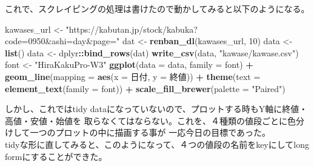 \documentclass[]{article}
\newenvironment{Shaded}{\begin{snugshade}}{\end{snugshade}}
\newcommand{\KeywordTok}[1]{\textcolor[rgb]{0.13,0.29,0.53}{\textbf{#1}}}
\newcommand{\DataTypeTok}[1]{\textcolor[rgb]{0.13,0.29,0.53}{#1}}
\newcommand{\DecValTok}[1]{\textcolor[rgb]{0.00,0.00,0.81}{#1}}
\newcommand{\StringTok}[1]{\textcolor[rgb]{0.31,0.60,0.02}{#1}}
\newcommand{\OperatorTok}[1]{\textcolor[rgb]{0.81,0.36,0.00}{\textbf{#1}}}
\newcommand{\NormalTok}[1]{#1}
\begin{document}
これで、スクレイピングの処理は書けたので動かしてみると以下のようになる。

\begin{Shaded}
\begin{Highlighting}[]
\NormalTok{kawases_url <-}\StringTok{ "https://kabutan.jp/stock/kabuka?code=0950&ashi=day&page="}
\NormalTok{dat <-}\StringTok{ }\KeywordTok{renban_dl}\NormalTok{(kawases_url, }\DecValTok{10}\NormalTok{)}
\NormalTok{data <-}\StringTok{ }\KeywordTok{list}\NormalTok{()}
\NormalTok{data <-}\StringTok{ }\NormalTok{dplyr}\OperatorTok{::}\KeywordTok{bind_rows}\NormalTok{(dat)}
\KeywordTok{write_csv}\NormalTok{(data, }\StringTok{"kawase/kawase.csv"}\NormalTok{)}
\NormalTok{font <-}\StringTok{ "HiraKakuPro-W3"}
\KeywordTok{ggplot}\NormalTok{(}\DataTypeTok{data =}\NormalTok{ data, }\DataTypeTok{family =}\NormalTok{ font) }\OperatorTok{+}
\StringTok{  }\KeywordTok{geom_line}\NormalTok{(}\DataTypeTok{mapping =} \KeywordTok{aes}\NormalTok{(}\DataTypeTok{x =}\NormalTok{ 日付, }\DataTypeTok{y =}\NormalTok{ 終値)) }\OperatorTok{+}
\StringTok{  }\KeywordTok{theme}\NormalTok{(}\DataTypeTok{text =} \KeywordTok{element_text}\NormalTok{(}\DataTypeTok{family =}\NormalTok{ font)) }\OperatorTok{+}
\StringTok{  }\KeywordTok{scale_fill_brewer}\NormalTok{(}\DataTypeTok{palette =} \StringTok{"Paired"}\NormalTok{)}
\end{Highlighting}
\end{Shaded}

しかし、これではtidy
dataになっていないので、プロットする時もY軸に終値・高値・安値・始値を
取らなくてはならない。これを、４種類の値段ごとに色分けして一つのプロットの中に描画する事が
一応今日の目標であった。\\
tidyな形に直してみると、このようになって、４つの値段の名前をkeyにしてlong
formにすることができた。

\begin{Shaded}
\end{Shaded}
\end{document}
